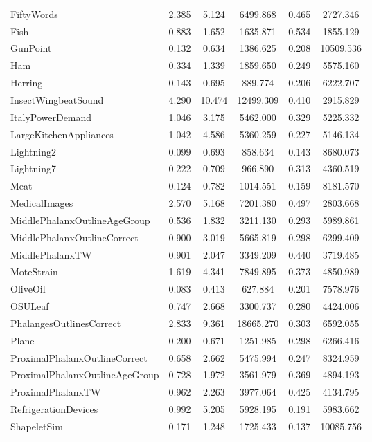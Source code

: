 \begin{table}[ht]
\begin{adjustbox}{width=0.7\textwidth,center}
\begin{tabular}{lccccc}
FiftyWords & 2.385 & 5.124 & 6499.868 & 0.465 & 2727.346 \\
Fish & 0.883 & 1.652 & 1635.871 & 0.534 & 1855.129 \\
GunPoint & 0.132 & 0.634 & 1386.625 & 0.208 & 10509.536 \\
Ham & 0.334 & 1.339 & 1859.650 & 0.249 & 5575.160 \\
Herring & 0.143 & 0.695 & 889.774 & 0.206 & 6222.707 \\
InsectWingbeatSound & 4.290 & 10.474 & 12499.309 & 0.410 & 2915.829 \\
ItalyPowerDemand & 1.046 & 3.175 & 5462.000 & 0.329 & 5225.332 \\
LargeKitchenAppliances & 1.042 & 4.586 & 5360.259 & 0.227 & 5146.134 \\
Lightning2 & 0.099 & 0.693 & 858.634 & 0.143 & 8680.073 \\
Lightning7 & 0.222 & 0.709 & 966.890 & 0.313 & 4360.519 \\
Meat & 0.124 & 0.782 & 1014.551 & 0.159 & 8181.570 \\
MedicalImages & 2.570 & 5.168 & 7201.380 & 0.497 & 2803.668 \\
MiddlePhalanxOutlineAgeGroup & 0.536 & 1.832 & 3211.130 & 0.293 & 5989.861 \\
MiddlePhalanxOutlineCorrect & 0.900 & 3.019 & 5665.819 & 0.298 & 6299.409 \\
MiddlePhalanxTW & 0.901 & 2.047 & 3349.209 & 0.440 & 3719.485 \\
MoteStrain & 1.619 & 4.341 & 7849.895 & 0.373 & 4850.989 \\
OliveOil & 0.083 & 0.413 & 627.884 & 0.201 & 7578.976 \\
OSULeaf & 0.747 & 2.668 & 3300.737 & 0.280 & 4424.006 \\
PhalangesOutlinesCorrect & 2.833 & 9.361 & 18665.270 & 0.303 & 6592.055 \\
Plane & 0.200 & 0.671 & 1251.985 & 0.298 & 6266.416 \\
ProximalPhalanxOutlineCorrect & 0.658 & 2.662 & 5475.994 & 0.247 & 8324.959 \\
ProximalPhalanxOutlineAgeGroup & 0.728 & 1.972 & 3561.979 & 0.369 & 4894.193 \\
ProximalPhalanxTW & 0.962 & 2.263 & 3977.064 & 0.425 & 4134.795 \\
RefrigerationDevices & 0.992 & 5.205 & 5928.195 & 0.191 & 5983.662 \\
ShapeletSim & 0.171 & 1.248 & 1725.433 & 0.137 & 10085.756 \\

\end{tabular}
\end{adjustbox}
\end{table}
